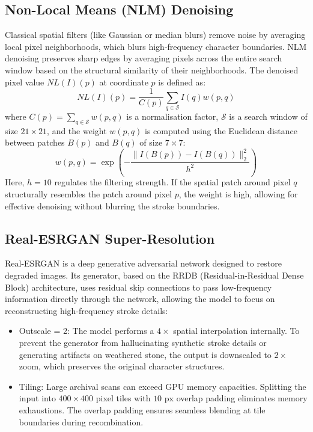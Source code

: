 \subsection{Non-Local Means (NLM) Denoising}
Classical spatial filters (like Gaussian or median blurs) remove noise by averaging local pixel neighborhoods, which blurs high-frequency character boundaries. NLM denoising preserves sharp edges by averaging pixels across the entire search window based on the structural similarity of their neighborhoods. The denoised pixel value $NL(I)(p)$ at coordinate $p$ is defined as:
\begin{equation}
NL(I)(p) = \frac{1}{C(p)} \sum_{q \in \mathcal{S}} I(q) w(p, q)
\end{equation}
where $C(p) = \sum_{q \in \mathcal{S}} w(p, q)$ is a normalisation factor, $\mathcal{S}$ is a search window of size $21 \times 21$, and the weight $w(p, q)$ is computed using the Euclidean distance between patches $B(p)$ and $B(q)$ of size $7 \times 7$:
\begin{equation}
w(p, q) = \exp\left( -\frac{\|I(B(p)) - I(B(q))\|_2^2}{h^2} \right)
\end{equation}
Here, $h = 10$ regulates the filtering strength. If the spatial patch around pixel $q$ structurally resembles the patch around pixel $p$, the weight is high, allowing for effective denoising without blurring the stroke boundaries.

\subsection{Real-ESRGAN Super-Resolution}
Real-ESRGAN is a deep generative adversarial network designed to restore degraded images. Its generator, based on the RRDB (Residual-in-Residual Dense Block) architecture, uses residual skip connections to pass low-frequency information directly through the network, allowing the model to focus on reconstructing high-frequency stroke details:
\begin{itemize}
	\item Outscale = 2: The model performs a $4\times$ spatial interpolation internally. To prevent the generator from hallucinating synthetic stroke details or generating artifacts on weathered stone, the output is downscaled to $2\times$ zoom, which preserves the original character structures.
	\item Tiling: Large archival scans can exceed GPU memory capacities. Splitting the input into $400 \times 400$ pixel tiles with $10\text{ px}$ overlap padding eliminates memory exhaustions. The overlap padding ensures seamless blending at tile boundaries during recombination.
\end{itemize}

